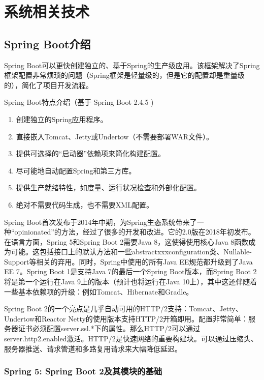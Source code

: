 
\chapter{系统相关技术}
\label{系统相关技术}

\section{Spring Boot介绍}

Spring Boot可以更快创建独立的、基于Spring的生产级应用。该框架解决了Spring框架配置非常烦琐的问题（Spring框架是轻量级的，但是它的配置却是重量级的），简化了项目开发流程\cite{.2019f}。

Spring Boot特点介绍（基于 Spring Boot 2.4.5 )

\begin{enumerate}
  \item 创建独立的Spring应用程序。
  \item 直接嵌入Tomcat、Jetty或Undertow（不需要部署WAR文件）。
  \item 提供可选择的“启动器”依赖项来简化构建配置。
  \item 尽可能地自动配置Spring和第三方库。
  \item 提供生产就绪特性，如度量、运行状况检查和外部化配置。
  \item 绝对不需要代码生成，也不需要XML配置。
\end{enumerate}

Spring Boot首次发布于2014年中期，为Spring生态系统带来了一种“opinionated”的方法，经过了很多的开发和改进。它的2.0版在2018年初发布。 在语言方面，Spring 5和Spring Boot 2需要Java 8，这使得使用核心Java 8函数成为可能。这包括接口上的默认方法和一些abstractxxxconfiguration类、Nullable-Support等相关的弃用。同时，Spring中使用的所有Java EE规范都升级到了Java EE 7。Spring Boot 1是支持Java 7的最后一个Spring Boot版本，而Spring Boot 2将是第一个运行在Java 9上的版本（预计也将运行在Java 10上），其中这还伴随着一些基本依赖项的升级：例如Tomcat、Hibernate和Gradle。

Spring Boot 2的一个亮点是几乎自动可用的HTTP/2支持：Tomcat、Jetty、Undertow和Reactor Netty的使用版本支持HTTP/2开箱即用。配置非常简单：服务器证书必须配置server.ssl.*下的属性。那么HTTP/2可以通过server.http2.enabled激活。HTTP/2是快速网络的重要构建块。可以通过压缩头、服务器推送、请求管道和多路复用请求来大幅降低延迟。

\subsection{Spring 5: Spring Boot 2及其模块的基础}

